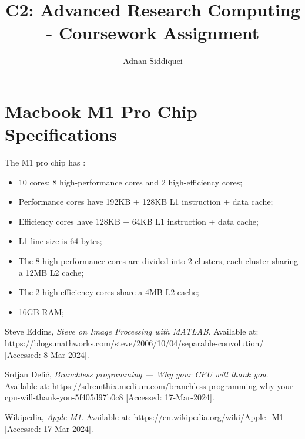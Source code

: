 \documentclass[a4paper,11pt]{article}
\title{\boldmath C2: Advanced Research Computing - Coursework Assignment}
\author{Adnan Siddiquei}
\affiliation{University of Cambridge}
\begin{document}
\maketitle
\flushbottom









\clearpage
\appendix

\section{Macbook M1 Pro Chip Specifications}\label{app:macbook-specs}
The M1 pro chip has \cite{apple-m1}:
\begin{itemize}
    \item 10 cores; 8 high-performance cores and 2 high-efficiency cores;
    \item Performance cores have 192KB + 128KB L1 instruction + data cache;
    \item Efficiency cores have 128KB + 64KB L1 instruction + data cache;
    \item L1 line size is 64 bytes;
    \item The 8 high-performance cores are divided into 2 clusters, each cluster sharing a 12MB L2 cache;
    \item The 2 high-efficiency cores share a 4MB L2 cache;
    \item 16GB RAM;
\end{itemize}



\begin{thebibliography}{99}

Steve Eddins,
\textit{Steve on Image Processing with MATLAB}.
Available at: \url{https://blogs.mathworks.com/steve/2006/10/04/separable-convolution/}
[Accessed: 8-Mar-2024].

Srdjan Delić,
\textit{Branchless programming — Why your CPU will thank you}.
Available at: \url{https://sdremthix.medium.com/branchless-programming-why-your-cpu-will-thank-you-5f405d97b0c8}
[Accessed: 17-Mar-2024].

Wikipedia,
\textit{Apple M1}.
Available at: \url{https://en.wikipedia.org/wiki/Apple_M1}
[Accessed: 17-Mar-2024].



\end{thebibliography}
\end{document}
